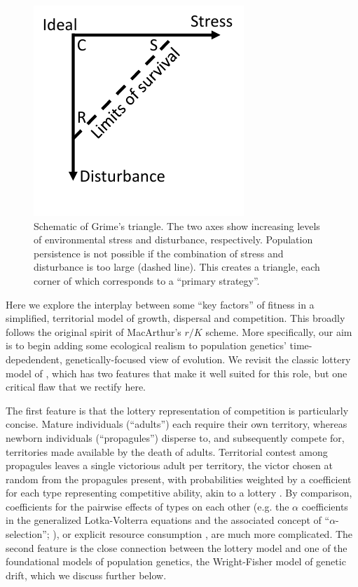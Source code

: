 \documentclass[11pt]{article}
\begin{document}
\begin{figure}
\centering
\includegraphics[scale=1]{grimeschematic.pdf}
\caption{\label{fig:grimeschematic} Schematic of Grime's triangle. The two axes show increasing levels of environmental stress and disturbance, respectively. Population persistence is not possible if the combination of stress and disturbance is too large (dashed line). This creates a triangle, each corner of which corresponds to a ``primary strategy''.} 
\end{figure}

Here we explore the interplay between some ``key factors'' of fitness in a simplified, territorial model of growth, dispersal and competition. This broadly follows the original spirit of MacArthur's $r/K$ scheme. More specifically, our aim is to begin adding some ecological realism to population genetics' time-depedendent, genetically-focused view of evolution. We revisit the classic lottery model of \cite{chesson_1981}, which has two features that make it well suited for this role, but one critical flaw that we rectify here.

The first feature is that the lottery representation of competition is  particularly concise. Mature individuals (``adults'') each require their own territory, whereas newborn individuals (``propagules'') disperse to, and subsequently compete for, territories made available by the death of adults. Territorial contest among propagules leaves a single victorious adult per territory, the victor chosen at random from the propagules present, with probabilities weighted by a coefficient for each type representing competitive ability, akin to a lottery \citep{sale_77}. By comparison, coefficients for the pairwise effects of types on each other (e.g. the $\alpha$ coefficients in the generalized Lotka-Volterra equations and the associated concept of ``$\alpha$-selection''; \citealt{gill_1974,case_1974,joshi_2001}), or  explicit resource consumption \citep{tilman_1982}, are much more complicated. The second feature is the close connection between the lottery model and one of the foundational models of population genetics, the Wright-Fisher model of genetic drift, which we discuss further below. 
\end{document}

